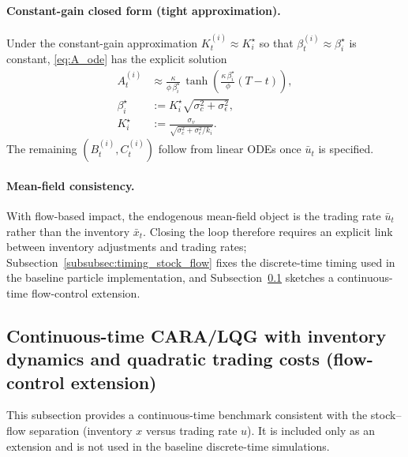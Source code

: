 \paragraph{Constant-gain closed form (tight approximation).}
Under the constant-gain approximation $K_t^{(i)}\approx K_i^\star$ so that
$\beta^{(i)}_t\approx \beta_i^\star$ is constant, \eqref{eq:A_ode} has the explicit solution
\begin{equation}
\begin{aligned}
A^{(i)}_t
&\approx
\frac{\kappa}{\phi\,\beta_i^\star}\,
\tanh\!\left(\frac{\kappa\,\beta_i^\star}{\phi}(T-t)\right),\\
\beta_i^\star &:= K_i^\star\sqrt{\sigma_c^2+\sigma_\epsilon^2},\\
K_i^\star &:= \frac{\sigma_v}{\sqrt{\sigma_c^2+\sigma_\epsilon^2/k_i}}.
\end{aligned}
\label{eq:A_closed_form}
\end{equation}
The remaining $(B^{(i)}_t,C^{(i)}_t)$ follow from linear ODEs once $\bar u_t$ is specified.

\paragraph{Mean-field consistency.}
With flow-based impact, the endogenous mean-field object is the trading rate $\bar u_t$ rather than the inventory $\bar x_t$.
Closing the loop therefore requires an explicit link between inventory adjustments and trading rates; Subsection~\ref{subsubsec:timing_stock_flow} fixes the discrete-time timing used in the baseline particle implementation, and Subsection~\ref{subsec:ct_flow_control_extension} sketches a continuous-time flow-control extension.

\subsection{Continuous-time CARA/LQG with inventory dynamics and quadratic trading costs (flow-control extension)}
\label{subsec:ct_flow_control_extension}
This subsection provides a continuous-time benchmark consistent with the stock--flow separation (inventory $x$ versus trading rate $u$). It is included only as an extension and is not used in the baseline discrete-time simulations.

